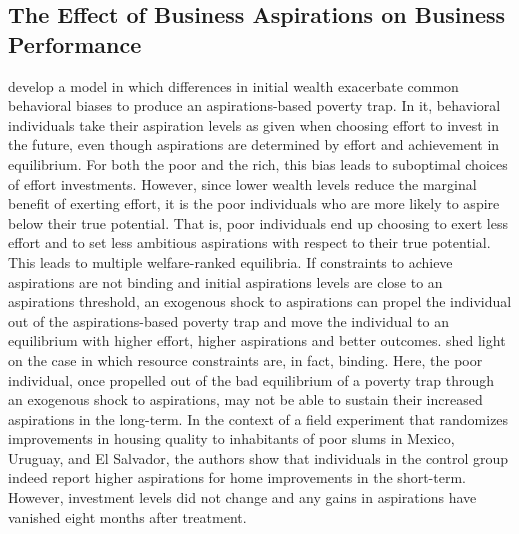 \documentclass[11.5pt]{article}
\begin{document}
\subsection{The Effect of Business Aspirations on Business Performance}

\citet{Dalton2016} develop a model in which differences in initial wealth exacerbate common behavioral biases to produce an aspirations-based poverty trap. In it, behavioral individuals take their aspiration levels as given when choosing effort to invest in the future, even though aspirations are determined by effort and achievement in equilibrium. For both the poor and the rich, this bias leads to suboptimal choices of effort investments. However, since lower wealth levels reduce the marginal benefit of exerting effort, it is the poor individuals who are more likely to aspire below their true potential. That is, poor individuals end up choosing to exert less effort and to set less ambitious aspirations with respect to their true potential. This leads to multiple welfare-ranked equilibria. If constraints to achieve aspirations are not binding and initial aspirations levels are close to an aspirations threshold, an exogenous shock to aspirations can propel the individual out of the aspirations-based poverty trap and move the individual to an equilibrium with higher effort, higher aspirations and better outcomes. \citet{Galiani2018} shed light on the case in which resource constraints are, in fact, binding. Here, the poor individual, once propelled out of the bad equilibrium of a poverty trap through an exogenous shock to aspirations, may not be able to sustain their increased aspirations in the long-term. In the context of a field experiment that randomizes improvements in housing quality to inhabitants of poor slums in Mexico, Uruguay, and El Salvador, the authors show that individuals in the control group indeed report higher aspirations for home improvements in the short-term. However, investment levels did not change and any gains in aspirations have vanished eight months after treatment.
\end{document}
